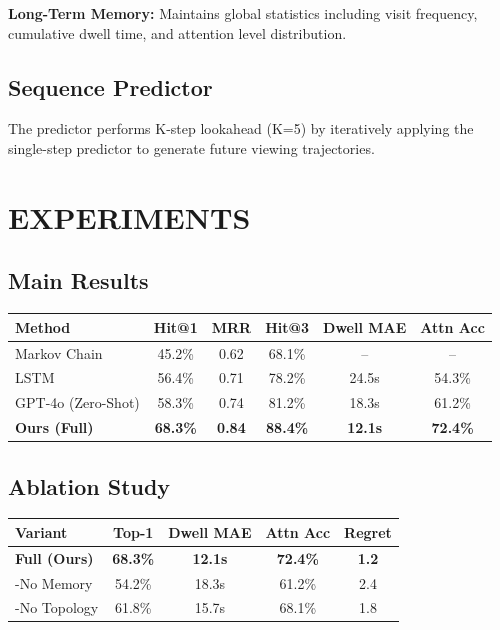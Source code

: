 \documentclass{article}
\begin{document}
\textbf{Long-Term Memory:} Maintains global statistics including visit frequency, cumulative dwell time, and attention level distribution.

\subsection{Sequence Predictor}

The predictor performs K-step lookahead (K=5) by iteratively applying the single-step predictor to generate future viewing trajectories.

\section{EXPERIMENTS}

\subsection{Main Results}

\begin{center}
\begin{tabular}{lccccc}
\hline
Method & Hit@1 & MRR & Hit@3 & Dwell MAE & Attn Acc \\
\hline
Markov Chain & 45.2\% & 0.62 & 68.1\% & -- & -- \\
LSTM & 56.4\% & 0.71 & 78.2\% & 24.5s & 54.3\% \\
GPT-4o (Zero-Shot) & 58.3\% & 0.74 & 81.2\% & 18.3s & 61.2\% \\
\textbf{Ours (Full)} & \textbf{68.3\%} & \textbf{0.84} & \textbf{88.4\%} & \textbf{12.1s} & \textbf{72.4\%} \\
\hline
\end{tabular}
\end{center}

\subsection{Ablation Study}

\begin{center}
\begin{tabular}{lcccc}
\hline
Variant & Top-1 & Dwell MAE & Attn Acc & Regret \\
\hline
\textbf{Full (Ours)} & \textbf{68.3\%} & \textbf{12.1s} & \textbf{72.4\%} & \textbf{1.2} \\
-No Memory & 54.2\% & 18.3s & 61.2\% & 2.4 \\
-No Topology & 61.8\% & 15.7s & 68.1\% & 1.8 \\
\hline
\end{tabular}
\end{center}
\end{document}
